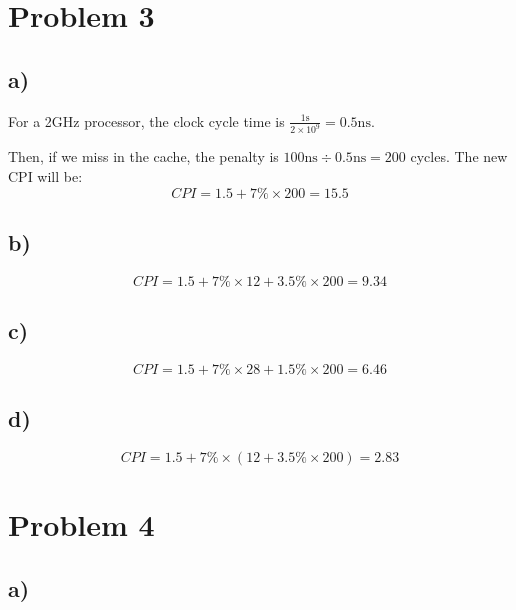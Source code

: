 \documentclass[a4paper,12pt]{article}
\begin{document}
\section*{Problem 3}

\subsection*{a)}

For a 2GHz processor, the clock cycle time is $\frac{1\text{s}}{2 \times 10^9} = 0.5\text{ns}$.

Then, if we miss in the cache, the penalty is $100\text{ns} \div 0.5\text{ns} = 200$ cycles.
The new CPI will be:
\begin{equation*}
	CPI = 1.5 + 7\% \times 200 = 15.5
\end{equation*}

\subsection*{b)}

\begin{equation*}
	CPI = 1.5 + 7\% \times 12 + 3.5\% \times 200 = 9.34
\end{equation*}

\subsection*{c)}

\begin{equation*}
	CPI = 1.5 + 7\% \times 28 + 1.5\% \times 200 = 6.46
\end{equation*}

\subsection*{d)}

\begin{equation*}
	CPI = 1.5 + 7\% \times (12 + 3.5\% \times 200) = 2.83
\end{equation*}

\section*{Problem 4}

\subsection*{a)}
\end{document}
